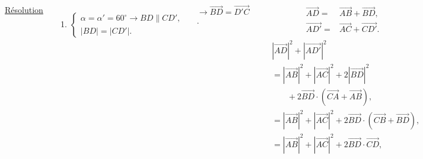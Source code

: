 \documentclass[10pt]{beamer}
\def \deg {^{\circ}}
\newcommand{\vect}[1] {
  \overrightarrow{#1}}
\begin{document}
{\begin{columns}[t]
		\underline{Résolution}\\ \flushleft
		
		\begin{enumerate}
		 \item $\begin{cases}\alpha = \alpha ' = 60\deg \rightarrow BD \parallel CD', \\ 
		       |BD|=|CD'|.
		       \end{cases}$
		       
		\end{enumerate}	\medskip
		
		$\rightarrow \vect{BD}=\vect{D'C}$. \\ \medskip
		
		\begin{align*}
		 \vect{AD}=& \vect{AB} + \vect{BD}, \\
		 \vect{AD'}=& \vect{AC} + \vect{CD'}. \\[0.5em]		 
		\end{align*}
		\vspace{-5mm}
		\begin{align*}
		 &|\vect{AD}|^2 + |\vect{AD'}|^2 \\[0.3em]
		 &= |\vect{AB}|^2 + |\vect{AC}|^2 + 2|\vect{BD}|^2  \\
		          &\phantom{{}=1}+ 2\vect{BD}\cdot(\vect{CA} + \vect{AB}), \\[0.3em]
		 &= |\vect{AB}|^2 + |\vect{AC}|^2 +2\vect{BD}\cdot (\vect{CB} + \vect{BD}), \\[0.3em]
		 &= |\vect{AB}|^2 + |\vect{AC}|^2 +2\vect{BD}\cdot\vect{CD},
		\end{align*}

	   \end{columns}
   
    }
	
\end{document}
